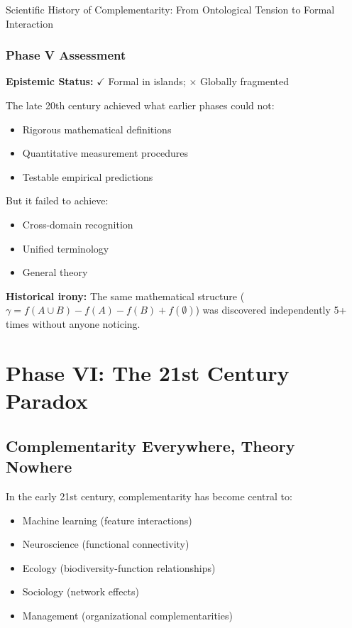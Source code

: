 \begin{chapter}{Scientific History of Complementarity: From Ontological Tension to Formal Interaction}
\subsubsection{Phase V Assessment}

\begin{tcolorbox}[colback=purple!5!white,colframe=purple!75!black,title=\textbf{Phase V Verdict}]
\textbf{Epistemic Status:} $\checkmark$ Formal in islands; $\times$ Globally fragmented

The late 20th century achieved what earlier phases could not:
\begin{itemize}[noitemsep]
    \item Rigorous mathematical definitions
    \item Quantitative measurement procedures
    \item Testable empirical predictions
\end{itemize}

But it failed to achieve:
\begin{itemize}[noitemsep]
    \item Cross-domain recognition
    \item Unified terminology
    \item General theory
\end{itemize}

\textbf{Historical irony:} The same mathematical structure ($\gamma = f(A \cup B) - f(A) - f(B) + f(\emptyset)$) was discovered independently 5+ times without anyone noticing.
\end{tcolorbox}

\section{Phase VI: The 21st Century Paradox}
\label{sec:phase-vi}

\subsection{Complementarity Everywhere, Theory Nowhere}

\begin{tcolorbox}[colback=red!5!white,colframe=red!75!black,title=\textbf{The Contemporary Bottleneck}]
In the early 21st century, complementarity has become central to:
\begin{itemize}[noitemsep]
    \item Machine learning (feature interactions)
    \item Neuroscience (functional connectivity)
    \item Ecology (biodiversity-function relationships)
    \item Sociology (network effects)
    \item Management (organizational complementarities)
\end{itemize}


\end{tcolorbox}
\end{chapter}
